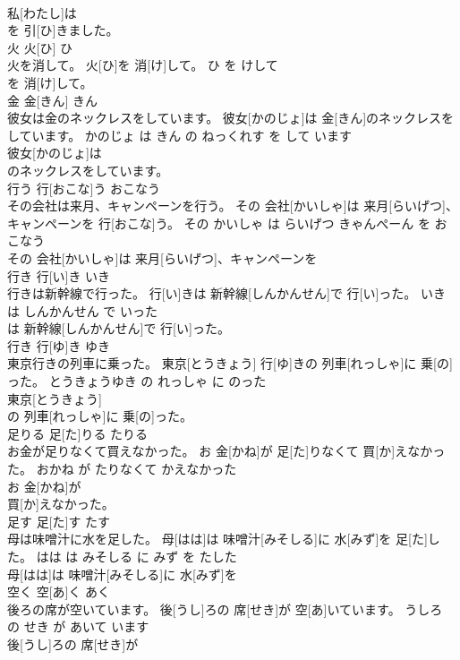\documentclass[8pt]{extreport}
\begin{document}
\begin{CJK}{UTF8}{min}
\\	私[わたし]は
\\	を 引[ひ]きました。			
\\	火	火[ひ]	ひ	
\\	火を消して。	火[ひ]を 消[け]して。	ひ を けして	
\\	を 消[け]して。			
\\	金	金[きん]	きん	
\\	彼女は金のネックレスをしています。	彼女[かのじょ]は 金[きん]のネックレスをしています。	かのじょ は きん の ねっくれす を して います	
\\	彼女[かのじょ]は
\\	のネックレスをしています。			
\\	行う	行[おこな]う	おこなう	
\\	その会社は来月、キャンペーンを行う。	その 会社[かいしゃ]は 来月[らいげつ]、キャンペーンを 行[おこな]う。	その かいしゃ は らいげつ きゃんぺーん を おこなう	
\\	その 会社[かいしゃ]は 来月[らいげつ]、キャンペーンを
\\	行き	行[い]き	いき	
\\	行きは新幹線で行った。	行[い]きは 新幹線[しんかんせん]で 行[い]った。	いき は しんかんせん で いった	
\\	は 新幹線[しんかんせん]で 行[い]った。			
\\	行き	行[ゆ]き	ゆき	
\\	東京行きの列車に乗った。	東京[とうきょう] 行[ゆ]きの 列車[れっしゃ]に 乗[の]った。	とうきょうゆき の れっしゃ に のった	
\\	東京[とうきょう]
\\	の 列車[れっしゃ]に 乗[の]った。			
\\	足りる	足[た]りる	たりる	
\\	お金が足りなくて買えなかった。	お 金[かね]が 足[た]りなくて 買[か]えなかった。	おかね が たりなくて かえなかった	
\\	お 金[かね]が
\\	買[か]えなかった。			
\\	足す	足[た]す	たす	
\\	母は味噌汁に水を足した。	母[はは]は 味噌汁[みそしる]に 水[みず]を 足[た]した。	はは は みそしる に みず を たした	
\\	母[はは]は 味噌汁[みそしる]に 水[みず]を
\\	空く	空[あ]く	あく	
\\	後ろの席が空いています。	後[うし]ろの 席[せき]が 空[あ]いています。	うしろ の せき が あいて います	
\\	後[うし]ろの 席[せき]が

\end{CJK}
\end{document}
